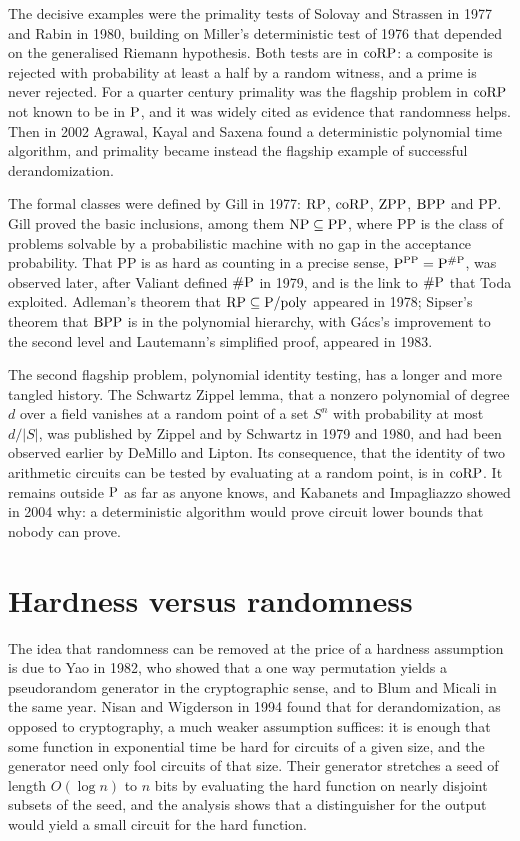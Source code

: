 The decisive examples were the primality tests of Solovay and Strassen in 1977 and Rabin in 1980, building on Miller's deterministic test of 1976 that depended on the generalised Riemann hypothesis. Both tests are in $\mathrm{coRP}$: a composite is rejected with probability at least a half by a random witness, and a prime is never rejected. For a quarter century primality was the flagship problem in $\mathrm{coRP}$ not known to be in $\mathrm{P}$, and it was widely cited as evidence that randomness helps. Then in 2002 Agrawal, Kayal and Saxena found a deterministic polynomial time algorithm, and primality became instead the flagship example of successful derandomization.

The formal classes were defined by Gill in 1977: $\mathrm{RP}$, $\mathrm{coRP}$, $\mathrm{ZPP}$, $\mathrm{BPP}$ and $\mathrm{PP}$. Gill proved the basic inclusions, among them $\mathrm{NP} \subseteq \mathrm{PP}$, where $\mathrm{PP}$ is the class of problems solvable by a probabilistic machine with no gap in the acceptance probability. That $\mathrm{PP}$ is as hard as counting in a precise sense, $\mathrm{P}^{\mathrm{PP}} = \mathrm{P}^{\#\mathrm{P}}$, was observed later, after Valiant defined $\#\mathrm{P}$ in 1979, and is the link to $\#\mathrm{P}$ that Toda exploited. Adleman's theorem that $\mathrm{RP} \subseteq \mathrm{P}/\mathrm{poly}$ appeared in 1978; Sipser's theorem that $\mathrm{BPP}$ is in the polynomial hierarchy, with G\'acs's improvement to the second level and Lautemann's simplified proof, appeared in 1983.

The second flagship problem, polynomial identity testing, has a longer and more tangled history. The Schwartz Zippel lemma, that a nonzero polynomial of degree $d$ over a field vanishes at a random point of a set $S^n$ with probability at most $d / |S|$, was published by Zippel and by Schwartz in 1979 and 1980, and had been observed earlier by DeMillo and Lipton. Its consequence, that the identity of two arithmetic circuits can be tested by evaluating at a random point, is in $\mathrm{coRP}$. It remains outside $\mathrm{P}$ as far as anyone knows, and Kabanets and Impagliazzo showed in 2004 why: a deterministic algorithm would prove circuit lower bounds that nobody can prove.

\section{Hardness versus randomness}

The idea that randomness can be removed at the price of a hardness assumption is due to Yao in 1982, who showed that a one way permutation yields a pseudorandom generator in the cryptographic sense, and to Blum and Micali in the same year. Nisan and Wigderson in 1994 found that for derandomization, as opposed to cryptography, a much weaker assumption suffices: it is enough that some function in exponential time be hard for circuits of a given size, and the generator need only fool circuits of that size. Their generator stretches a seed of length $O(\log n)$ to $n$ bits by evaluating the hard function on nearly disjoint subsets of the seed, and the analysis shows that a distinguisher for the output would yield a small circuit for the hard function.

